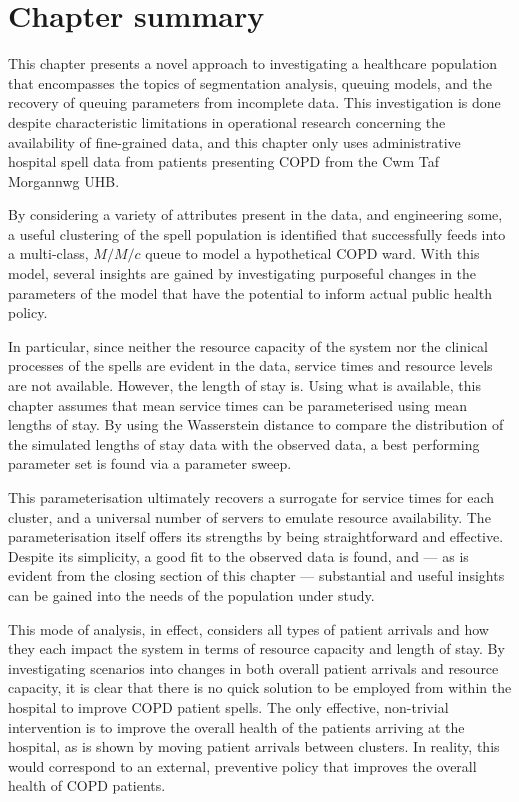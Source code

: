 \section{Chapter summary}\label{sec:summary}

This chapter presents a novel approach to investigating a healthcare population
that encompasses the topics of segmentation analysis, queuing models, and the
recovery of queuing parameters from incomplete data. This investigation is done
despite characteristic limitations in operational research concerning the
availability of fine-grained data, and this chapter only uses administrative
hospital spell data from patients presenting COPD from the Cwm Taf Morgannwg
UHB.\

By considering a variety of attributes present in the data, and engineering
some, a useful clustering of the spell population is identified that
successfully feeds into a multi-class, \(M/M/c\) queue to model a hypothetical
COPD ward. With this model, several insights are gained by investigating
purposeful changes in the parameters of the model that have the potential to
inform actual public health policy.

In particular, since neither the resource capacity of the system nor the
clinical processes of the spells are evident in the data, service times and
resource levels are not available. However, the length of stay is. Using what is
available, this chapter assumes that mean service times can be parameterised
using mean lengths of stay. By using the Wasserstein distance to compare the
distribution of the simulated lengths of stay data with the observed data, a
best performing parameter set is found via a parameter sweep.

This parameterisation ultimately recovers a surrogate for service times for each
cluster, and a universal number of servers to emulate resource availability. The
parameterisation itself offers its strengths by being straightforward and
effective. Despite its simplicity, a good fit to the observed data is found,
and --- as is evident from the closing section of this chapter --- substantial
and useful insights can be gained into the needs of the population under study.

This mode of analysis, in effect, considers all types of patient arrivals and
how they each impact the system in terms of resource capacity and length of
stay. By investigating scenarios into changes in both overall patient arrivals
and resource capacity, it is clear that there is no quick solution to be
employed from within the hospital to improve COPD patient spells. The only
effective, non-trivial intervention is to improve the overall health of the
patients arriving at the hospital, as is shown by moving patient arrivals
between clusters. In reality, this would correspond to an external, preventive
policy that improves the overall health of COPD patients.
